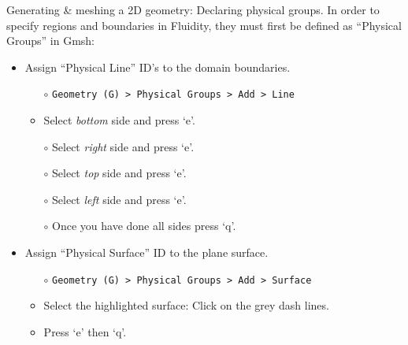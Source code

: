 \documentclass[t]{beamer}
\begin{document}
\begin{frame}{Generating \& meshing a 2D geometry: Declaring physical groups.}
In order to specify regions and boundaries in Fluidity, they must first be defined as ``Physical Groups'' in Gmsh:\\[15pt]

\begin{itemize}
   \item Assign ``Physical Line'' ID's to the domain boundaries.
   \begin{itemize}
      \item[$\circ$] \lstinline{Geometry (G) > Physical Groups > Add > Line}
      \item[$\circ$] Select \emph{bottom} side and press `e'.
      \item[$\circ$] Select \emph{right} side and press `e'.
      \item[$\circ$] Select \emph{top} side and press `e'.
      \item[$\circ$] Select \emph{left} side and press `e'.
      \item[$\circ$] Once you have done all sides press `q'.\\[15pt]
   \end{itemize}
   \item Assign ``Physical Surface'' ID to the plane surface.
   \begin{itemize}
      \item[$\circ$] \lstinline{Geometry (G) > Physical Groups > Add > Surface}
      \item[$\circ$] Select the highlighted surface: Click on the grey dash lines.
      \item[$\circ$] Press `e' then `q'.
   \end{itemize}
\end{itemize}
\end{frame}
\end{document}
